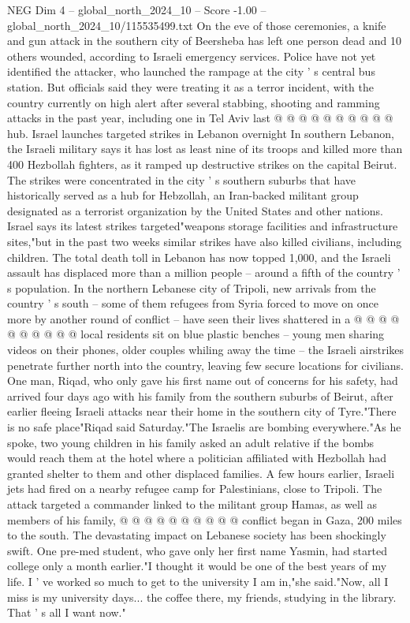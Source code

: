 \begin{textsample}{NEG Dim 4 – global\_north\_2024\_10 – Score -1.00 – global\_north\_2024\_10/115535499.txt}
On the eve of those ceremonies, a knife and gun attack in the southern city of Beersheba has left one person dead and 10 others wounded, according to Israeli emergency services.
Police have not yet identified the attacker, who launched the rampage at the city ' s central bus station.
But officials said they were treating it as a terror incident, with the country currently on high alert after several stabbing, shooting and ramming attacks in the past year, including one in Tel Aviv last @ @ @ @ @ @ @ @ @ @ hub.
Israel launches targeted strikes in Lebanon overnight In southern Lebanon, the Israeli military says it has lost as least nine of its troops and killed more than 400 Hezbollah fighters, as it ramped up destructive strikes on the capital Beirut.
The strikes were concentrated in the city ' s southern suburbs that have historically served as a hub for Hebzollah, an Iran-backed militant group designated as a terrorist organization by the United States and other nations.
Israel says its latest strikes targeted"weapons storage facilities and infrastructure sites,"but in the past two weeks similar strikes have also killed civilians, including children.
The total death toll in Lebanon has now topped 1,000, and the Israeli assault has displaced more than a million people -- around a fifth of the country ' s population.
In the northern Lebanese city of Tripoli, new arrivals from the country ' s south -- some of them refugees from Syria forced to move on once more by another round of conflict -- have seen their lives shattered in a @ @ @ @ @ @ @ @ @ @ local residents sit on blue plastic benches -- young men sharing videos on their phones, older couples whiling away the time -- the Israeli airstrikes penetrate further north into the country, leaving few secure locations for civilians.
One man, Riqad, who only gave his first name out of concerns for his safety, had arrived four days ago with his family from the southern suburbs of Beirut, after earlier fleeing Israeli attacks near their home in the southern city of Tyre."There is no safe place"Riqad said Saturday."The Israelis are bombing everywhere."As he spoke, two young children in his family asked an adult relative if the bombs would reach them at the hotel where a politician affiliated with Hezbollah had granted shelter to them and other displaced families.
A few hours earlier, Israeli jets had fired on a nearby refugee camp for Palestinians, close to Tripoli.
The attack targeted a commander linked to the militant group Hamas, as well as members of his family, @ @ @ @ @ @ @ @ @ @ conflict began in Gaza, 200 miles to the south.
The devastating impact on Lebanese society has been shockingly swift.
One pre-med student, who gave only her first name Yasmin, had started college only a month earlier."I thought it would be one of the best years of my life.
I ' ve worked so much to get to the university I am in,"she said."Now, all I miss is my university days... the coffee there, my friends, studying in the library.
That ' s all I want now."

\end{textsample}
